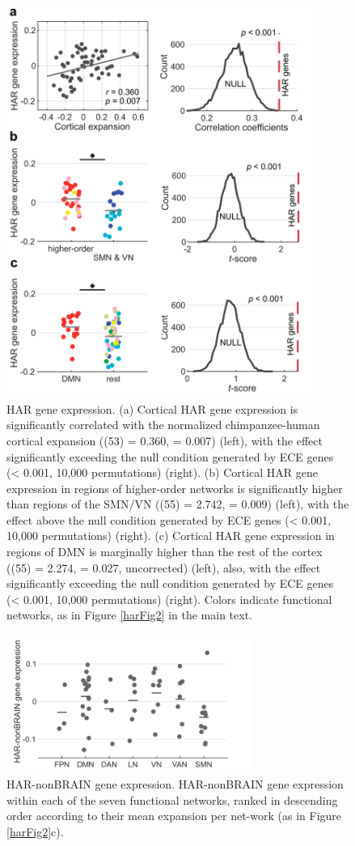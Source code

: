 \begin{refsection}
\begin{figure}[H]
    \centering
    \includegraphics[width=10cm]{images/harFigS1.png}
    \caption{HAR gene expression. (a) Cortical HAR gene expression is significantly correlated with the normalized chimpanzee-human cortical expansion (\rvaldf(53) = 0.360, \pval = 0.007) (left), with the effect significantly exceeding the null condition generated by ECE genes (\pval < 0.001, 10,000 permutations) (right). (b) Cortical HAR gene expression in regions of higher-order networks is significantly higher than regions of the SMN/VN (\tvaldf(55) = 2.742, \pval = 0.009) (left), with the effect above the null condition generated by ECE genes (\pval < 0.001, 10,000 permutations) (right). (c) Cortical HAR gene expression in regions of DMN is marginally higher than the rest of the cortex (\tvaldf(55) = 2.274, \pval = 0.027, uncorrected) (left), also, with the effect significantly exceeding the null condition generated by ECE genes (\pval < 0.001, 10,000 permutations) (right). Colors indicate functional networks, as in Figure \ref{harFig2} in the main text.}
    \label{harFigs1}
\end{figure}


\begin{figure}[H]
    \centering
    \includegraphics[width=8cm]{images/harFigS2.png}
    \caption{HAR-nonBRAIN gene expression. HAR-nonBRAIN gene expression within each of the seven functional networks, ranked in descending order according to their mean expansion per net-work (as in Figure \ref{harFig2}c).}
    \label{harFigs2}
\end{figure}


\end{refsection}
